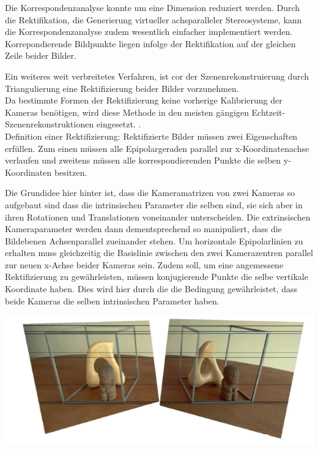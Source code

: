 Die Korrespondenzanalyse konnte um eine Dimension reduziert werden. Durch die
Rektifikation, die Generierung virtueller achsparalleler Stereosysteme, kann die Korrespondenzanalyse
zudem wesentlich einfacher implementiert werden. Korrepondierende
Bildpunkte liegen infolge der Rektifikation auf der gleichen Zeile beider Bilder.\cite{phdextrinsicPara}

Ein weiteres weit verbreitetes Verfahren, ist cor der Szenenrekonstruierung durch Triangulierung eine Rektifizierung beider Bilder vorzunehmen\cite{MatlabRec,ZZ,Javier,Fusiello}.\\ 

Da bestimmte Formen der Rektifizierung keine vorherige Kalibrierung der Kameras benötigen, wird diese Methode in den meisten gängigen Echtzeit-Szenenrekonstruktionen eingesetzt. \cite{Fusiello,Javier,R.H.}.\\



Definition einer Rektifizierung:
Rektifizierte Bilder müssen zwei Eigenschaften erfüllen. Zum einen müssen alle Epipolargeraden parallel zur x-Koordinatenachse verlaufen und zweitens müssen alle korrespondierenden Punkte die selben y-Koordinaten besitzen\cite{ZZ}.

 Die Grundidee hier hinter ist, dass die Kameramatrizen von zwei Kameras so aufgebaut sind dass die intrinsischen Parameter die selben sind, sie sich aber in ihren Rotationen und Translationen voneinander unterscheiden. Die extrinsischen Kameraparameter werden dann dementsprechend so manipuliert, dass die Bildebenen Achsenparallel zueinander stehen\cite{FusielloSite,Fusiello}. Um horizontale Epipolarlinien zu erhalten muss gleichzeitig die Basislinie zwischen den zwei Kamerazentren parallel zur neuen x-Achse beider Kameras sein. Zudem soll, um eine angemessene Rektifizierung zu gewährleisten, müssen konjugierende Punkte die selbe vertikale Koordinate haben. Dies wird hier durch die die Bedingung gewährleistet, dass beide Kameras die selben intrinsischen Parameter haben\cite{FusielloSite}.

\begin{minipage}{\linewidth}
	\centering
	\includegraphics[width=.8\linewidth]{images/rectifiziertesBildAusZZ.png}
\end{minipage}\\ \\


